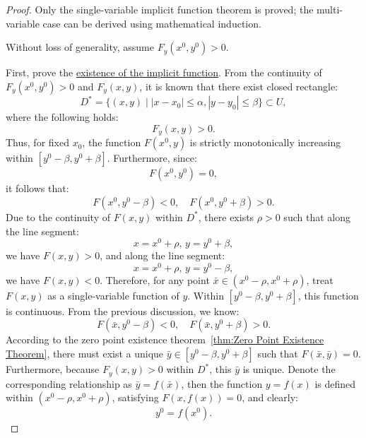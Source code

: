 \documentclass[11pt]{../../TexTemplate/elegantbook}
\begin{document}
\begin{proof}
    Only the single-variable implicit function theorem is proved; 
    the multi-variable case can be derived using mathematical induction.
    
    Without loss of generality, assume \(F_y(x^0, y^0) > 0\).

    First, prove the \underline{existence of the implicit function}.  
    From the continuity of \(F_y(x^{0}, y^{0}) > 0\) and \(F_y(x, y)\), 
    it is known that there exist closed rectangle:
    \[
    D^* = \{(x, y) \mid |x - x_0| \leq \alpha, |y - y_0| \leq \beta\} \subset U,
    \]
    where the following holds:
    \[
    F_y(x, y) > 0.
    \]
    Thus, for fixed \(x_0\), the function \(F(x^{0}, y)\) is strictly monotonically increasing 
    within \([y^{0} - \beta, y^{0} + \beta]\). Furthermore, since:
    \[
    F(x^{0}, y^{0}) = 0,
    \]
    it follows that:
    \[
    F(x^{0}, y^{0} - \beta) < 0, \quad F(x^{0}, y^{0} + \beta) > 0.
    \]
    Due to the continuity of \(F(x, y)\) within \(D^*\), there exists \(\rho > 0\) such that along the line segment:
    \[
    x = x^{0} + \rho, \, y = y^{0} + \beta,
    \]
    we have \(F(x, y) > 0\), and along the line segment:
    \[
    x = x^{0} + \rho, \, y = y^{0} - \beta,
    \]
    we have \(F(x, y) < 0\).
    Therefore, for any point \(\bar{x} \in (x^{0} - \rho, x^{0} + \rho)\), treat \(F(x, y)\) as a single-variable function of \(y\). 
    Within \([y^{0} - \beta, y^{0} + \beta]\), this function is continuous. From the previous discussion, we know:
    \[
    F(\bar{x}, y^{0} - \beta) < 0, \quad F(\bar{x}, y^{0} + \beta) > 0.
    \]
    According to the zero point existence theorem~\ref{thm:Zero Point Existence Theorem}, 
    there must exist a unique \(\bar{y} \in [y^{0} - \beta, y^{0} + \beta]\) 
    such that \(F(\bar{x}, \bar{y}) = 0\). 
    Furthermore, because \(F_y(x, y) > 0\) within \(D^*\), this \(\bar{y}\) is unique.
    Denote the corresponding relationship as \(\bar{y} = f(\bar{x})\), 
    then the function \(y = f(x)\) is defined within \((x^{0} - \rho, x^{0} + \rho)\), 
    satisfying \(F(x, f(x)) = 0\), and clearly:
    \[
    y^{0} = f(x^{0}).
    \]


\end{proof}
\end{document}

